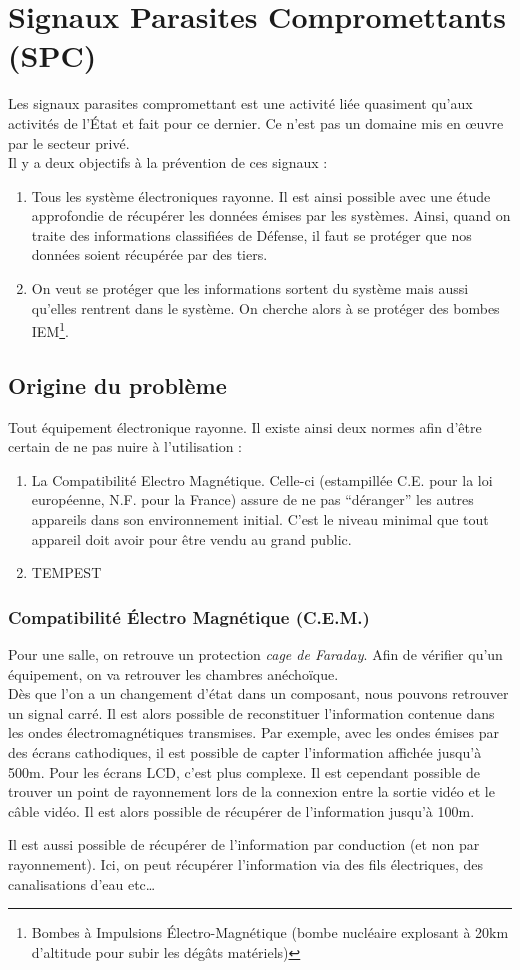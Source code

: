 \section{Signaux Parasites Compromettants (SPC)}
Les signaux parasites compromettant est une activité liée quasiment qu'aux activités de l’État et fait pour ce dernier. Ce n'est pas un domaine mis en œuvre par le secteur privé.\\
Il y a deux objectifs à la prévention de ces signaux :
\begin{enumerate}[label=\Roman*.]
 \item Tous les système électroniques rayonne. Il est ainsi possible avec une étude approfondie de récupérer les données émises par les systèmes. Ainsi, quand on traite des informations classifiées de Défense, il faut se protéger que nos données soient récupérée par des tiers.
 \item On veut se protéger que les informations sortent du système mais aussi qu'elles rentrent dans le système. On cherche alors à se protéger des bombes IEM\footnote{Bombes à Impulsions Électro-Magnétique (bombe nucléaire explosant à 20km d'altitude pour subir les dégâts matériels)}.
\end{enumerate}
\subsection{Origine du problème}
Tout équipement électronique rayonne. Il existe ainsi deux normes afin d'être certain de ne pas nuire à l'utilisation :
\begin{enumerate}[label=\Roman*.]
 \item La Compatibilité Electro Magnétique. Celle-ci (estampillée C.E. pour la loi européenne, N.F. pour la France) assure de ne pas \enquote{déranger} les autres appareils dans son environnement initial. C'est le niveau minimal que tout appareil doit avoir pour être vendu au grand public.
 \item TEMPEST
\end{enumerate}
\subsubsection{Compatibilité Électro Magnétique (C.E.M.)}
Pour une salle, on retrouve un protection \textit{cage de Faraday}. Afin de vérifier qu'un équipement, on va retrouver les chambres anéchoïque.\\
Dès que l'on a un changement d'état dans un composant, nous pouvons retrouver un signal carré. Il est alors possible de reconstituer l'information contenue dans les ondes électromagnétiques transmises. Par exemple, avec les ondes émises par des écrans cathodiques, il est possible de capter l'information affichée jusqu'à 500m. Pour les écrans LCD, c'est plus complexe. Il est cependant possible de trouver un point de rayonnement lors de la connexion entre la sortie vidéo et le câble vidéo. Il est alors possible de récupérer de l'information jusqu'à 100m.\\\par
Il est aussi possible de récupérer de l'information par conduction (et non par rayonnement). Ici, on peut récupérer l'information via des fils électriques, des canalisations d'eau etc\ldots
